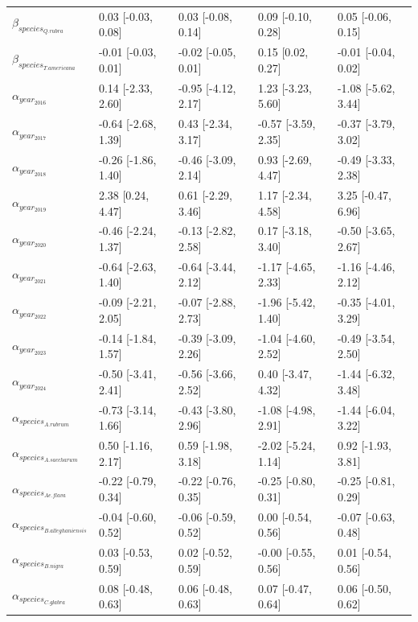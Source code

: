\documentclass{article}\usepackage[]{graphicx}\usepackage[]{xcolor}
\begin{document}
\begin{table}[ht]
\begin{tabular}{lllll}
  $\beta_{species_{Q. rubra}}$ & 0.03 [-0.03, 0.08] & 0.03 [-0.08, 0.14] & 0.09 [-0.10, 0.28] & 0.05 [-0.06, 0.15] \\ 
  $\beta_{species_{T. americana}}$ & -0.01 [-0.03, 0.01] & -0.02 [-0.05, 0.01] & 0.15 [0.02, 0.27] & -0.01 [-0.04, 0.02] \\ 
  $\alpha_{year_{2016}}$ & 0.14 [-2.33, 2.60] & -0.95 [-4.12, 2.17] & 1.23 [-3.23, 5.60] & -1.08 [-5.62, 3.44] \\ 
  $\alpha_{year_{2017}}$ & -0.64 [-2.68, 1.39] & 0.43 [-2.34, 3.17] & -0.57 [-3.59, 2.35] & -0.37 [-3.79, 3.02] \\ 
  $\alpha_{year_{2018}}$ & -0.26 [-1.86, 1.40] & -0.46 [-3.09, 2.14] & 0.93 [-2.69, 4.47] & -0.49 [-3.33, 2.38] \\ 
  $\alpha_{year_{2019}}$ & 2.38 [0.24, 4.47] & 0.61 [-2.29, 3.46] & 1.17 [-2.34, 4.58] & 3.25 [-0.47, 6.96] \\ 
  $\alpha_{year_{2020}}$ & -0.46 [-2.24, 1.37] & -0.13 [-2.82, 2.58] & 0.17 [-3.18, 3.40] & -0.50 [-3.65, 2.67] \\ 
  $\alpha_{year_{2021}}$ & -0.64 [-2.63, 1.40] & -0.64 [-3.44, 2.12] & -1.17 [-4.65, 2.33] & -1.16 [-4.46, 2.12] \\ 
  $\alpha_{year_{2022}}$ & -0.09 [-2.21, 2.05] & -0.07 [-2.88, 2.73] & -1.96 [-5.42, 1.40] & -0.35 [-4.01, 3.29] \\ 
  $\alpha_{year_{2023}}$ & -0.14 [-1.84, 1.57] & -0.39 [-3.09, 2.26] & -1.04 [-4.60, 2.52] & -0.49 [-3.54, 2.50] \\ 
  $\alpha_{year_{2024}}$ & -0.50 [-3.41, 2.41] & -0.56 [-3.66, 2.52] & 0.40 [-3.47, 4.32] & -1.44 [-6.32, 3.48] \\ 
  $\alpha_{species_{A. rubrum}}$ & -0.73 [-3.14, 1.66] & -0.43 [-3.80, 2.96] & -1.08 [-4.98, 2.91] & -1.44 [-6.04, 3.22] \\ 
  $\alpha_{species_{A. saccharum}}$ & 0.50 [-1.16, 2.17] & 0.59 [-1.98, 3.18] & -2.02 [-5.24, 1.14] & 0.92 [-1.93, 3.81] \\ 
  $\alpha_{species_{Ae. flava}}$ & -0.22 [-0.79, 0.34] & -0.22 [-0.76, 0.35] & -0.25 [-0.80, 0.31] & -0.25 [-0.81, 0.29] \\ 
  $\alpha_{species_{B. alleghaniensis}}$ & -0.04 [-0.60, 0.52] & -0.06 [-0.59, 0.52] & 0.00 [-0.54, 0.56] & -0.07 [-0.63, 0.48] \\ 
  $\alpha_{species_{B. nigra}}$ & 0.03 [-0.53, 0.59] & 0.02 [-0.52, 0.59] & -0.00 [-0.55, 0.56] & 0.01 [-0.54, 0.56] \\ 
  $\alpha_{species_{C. glabra}}$ & 0.08 [-0.48, 0.63] & 0.06 [-0.48, 0.63] & 0.07 [-0.47, 0.64] & 0.06 [-0.50, 0.62] \\ 

\end{tabular}
\end{table}
\end{document}

